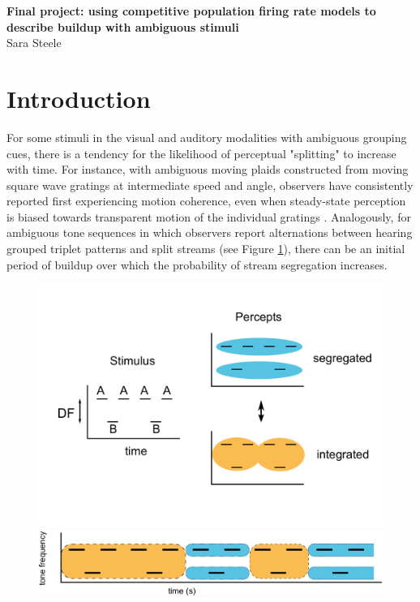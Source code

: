 \documentclass[10pt]{article}
\date{}
\begin{document}
\begin{flushleft}
{\Large
\textbf{Final project: using competitive population firing rate models to describe buildup with ambiguous stimuli}
}
\\
Sara Steele
\end{flushleft}

\section*{Introduction}
For some stimuli in the visual and auditory modalities with ambiguous grouping cues, there is a tendency for the likelihood of perceptual "splitting" to increase with time. For instance, with ambiguous moving plaids constructed from moving square wave gratings at intermediate speed and angle, observers have consistently reported first experiencing motion coherence, even when steady-state perception is biased towards transparent motion of the individual gratings \cite{Rubin2004}. Analogously, for ambiguous tone sequences in which observers report alternations between hearing grouped triplet patterns and split streams \cite{Noorden1975} (see Figure \ref{fig:percepts_timecourse}), there can be an initial period of buildup over which the probability of stream segregation increases. 


\begin{figure}[scale = 0.5]
	\centering
	\includegraphics[scale=0.35]{../aba_stimulus-percepts}
	\includegraphics[scale=0.47]{../percepts_timecourse}
	\caption{}
	\label{fig:percepts_timecourse}
\end{figure}
\end{document}
